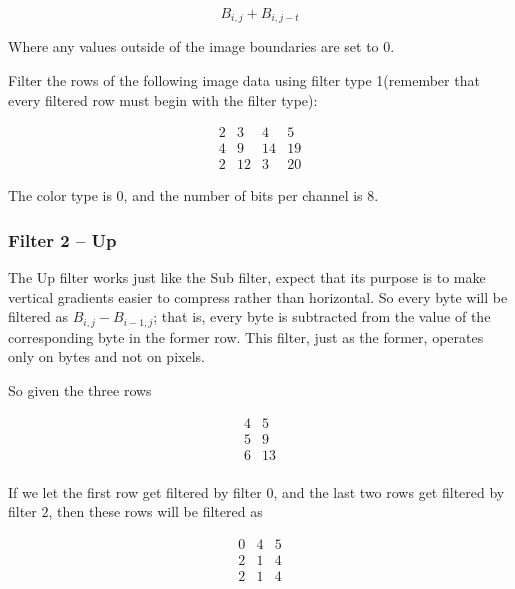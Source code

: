 \begin{equation*}
  B_{i,j} + B_{i,j-t}
\end{equation*}

Where any values outside of the image boundaries are set to $0$.

\begin{Exercise}[label={filter-1}]

  Filter the rows of the following image data using filter type
  1(remember that every filtered row must begin with the filter type):

  \[
  \begin{matrix}
    2 & 3 & 4 & 5 \\
    4 & 9 & 14 & 19 \\
    2 & 12 & 3 & 20
  \end{matrix}
  \]

  The color type is $0$, and the number of bits per channel is $8$.

\end{Exercise}

\subsubsection{Filter 2 -- Up}

The Up filter works just like the Sub filter, expect that its purpose
is to make vertical gradients easier to compress rather than
horizontal. So every byte will be filtered as $B_{i,j} - B_{i-1,j}$;
that is, every byte is subtracted from the value of the corresponding
byte in the former row. This filter, just as the former, operates only
on bytes and not on pixels.

So given the three rows

\[
\begin{matrix}
  4 & 5 \\
  5 & 9 \\
  6 & 13 \\
\end{matrix}
\]

If we let the first row get filtered by filter $0$, and the last two
rows get filtered by filter $2$, then these rows will be filtered as

\[
\begin{matrix}
  0 & 4 & 5 \\
  2 & 1 & 4 \\
  2 & 1 & 4 \\
\end{matrix}
\]

